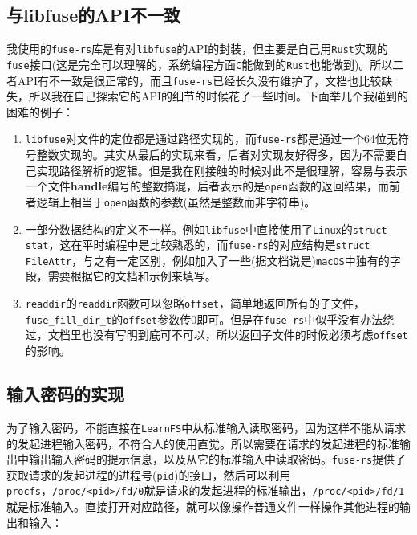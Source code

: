 \documentclass[12pt, UTF8]{article}
\begin{document}
\subsection{与libfuse的API不一致}

我使用的\lstinline|fuse-rs|库是有对\lstinline|libfuse|的API的封装，但主要是自己用\lstinline|Rust|实现的\lstinline|fuse|接口(这是完全可以理解的，系统编程方面\lstinline|C|能做到的\lstinline|Rust|也能做到)。所以二者API有不一致是很正常的，而且\lstinline|fuse-rs|已经长久没有维护了，文档也比较缺失，所以我在自己探索它的API的细节的时候花了一些时间。下面举几个我碰到的困难的例子：

\begin{enumerate}
  \item \lstinline|libfuse|对文件的定位都是通过路径实现的，而\lstinline|fuse-rs|都是通过一个64位无符号整数实现的。其实从最后的实现来看，后者对实现友好得多，因为不需要自己实现路径解析的逻辑。但是我在刚接触的时候对此不是很理解，容易与表示一个文件\textbf{handle}编号的整数搞混，后者表示的是\lstinline|open|函数的返回结果，而前者逻辑上相当于\lstinline|open|函数的参数(虽然是整数而非字符串)。
  \item 一部分数据结构的定义不一样。例如\lstinline|libfuse|中直接使用了\lstinline|Linux|的\lstinline|struct stat|，这在平时编程中是比较熟悉的，而\lstinline|fuse-rs|的对应结构是\lstinline|struct FileAttr|，与之有一定区别，例如加入了一些(据文档说是)\lstinline|macOS|中独有的字段，需要根据它的文档和示例来填写。
  \item \lstinline|readdir|的\lstinline|readdir|函数可以忽略\lstinline|offset|，简单地返回所有的子文件，\lstinline|fuse_fill_dir_t|的\lstinline|offset|参数传0即可。但是在\lstinline|fuse-rs|中似乎没有办法绕过，文档里也没有写明到底可不可以，所以返回子文件的时候必须考虑\lstinline|offset|的影响。
\end{enumerate}

\subsection{输入密码的实现}

为了输入密码，不能直接在\lstinline|LearnFS|中从标准输入读取密码，因为这样不能从请求的发起进程输入密码，不符合人的使用直觉。所以需要在请求的发起进程的标准输出中输出输入密码的提示信息，以及从它的标准输入中读取密码。\lstinline|fuse-rs|提供了获取请求的发起进程的进程号(\lstinline|pid|)的接口，然后可以利用\lstinline|procfs|，\lstinline|/proc/<pid>/fd/0|就是请求的发起进程的标准输出，\lstinline|/proc/<pid>/fd/1|就是标准输入。直接打开对应路径，就可以像操作普通文件一样操作其他进程的输出和输入：
\end{document}
